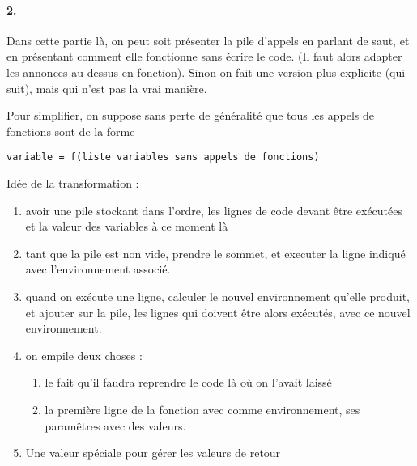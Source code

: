 \paragraph{2.} \enspace
\begin{com}
	Dans cette partie là, on peut soit présenter la pile d'appels en parlant de saut, et en présentant comment elle fonctionne sans écrire le code. (Il faut alors adapter les annonces au dessus en fonction). Sinon on fait une version plus explicite (qui suit), mais qui n'est pas la vrai manière.
\end{com}

Pour simplifier, on suppose sans perte de généralité que tous les appels de fonctions sont de la forme
\begin{lstlisting}[style=CStyle]
variable = f(liste variables sans appels de fonctions)
\end{lstlisting}



Idée de la transformation : \begin{enumerate}
	\item avoir une pile stockant dans l'ordre, les lignes de code devant être exécutées et la valeur des variables à ce moment là
	\item tant que la pile est non vide, prendre le sommet, et executer la ligne indiqué avec l'environnement associé.
	\item quand on exécute une ligne, calculer le nouvel environnement qu'elle produit, et ajouter sur la pile, les lignes qui doivent être alors exécutés, avec ce nouvel environnement.
	\item on empile deux choses : \begin{enumerate}
		\item le fait qu'il faudra reprendre le code là où on l'avait laissé
		\item la première ligne de la fonction avec comme environnement, ses paramêtres avec des valeurs.
		\end{enumerate}
	\item Une valeur spéciale pour gérer les valeurs de retour
\end{enumerate} \enspace\\

